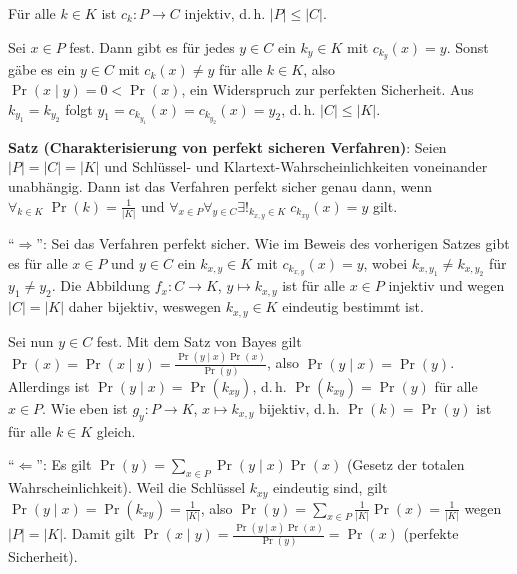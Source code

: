 \begin{Beweis}
    Für alle $k \in K$ ist $c_k\colon P \rightarrow C$ injektiv, d.\,h. $|P| \le |C|$.

    Sei $x \in P$ fest.
    Dann gibt es für jedes $y \in C$ ein $k_y \in K$ mit $c_{k_y}(x) = y$.
    Sonst gäbe es ein $y \in C$ mit $c_k(x) \not= y$ für alle $k \in K$,
    also $\Pr(x \;|\; y) = 0 < \Pr(x)$, ein Widerspruch zur perfekten Sicherheit.
    Aus $k_{y_1} = k_{y_2}$ folgt $y_1 = c_{k_{y_1}}(x) = c_{k_{y_2}}(x) = y_2$,
    d.\,h. $|C| \le |K|$.
\end{Beweis}

\linie

\textbf{Satz (Charakterisierung von perfekt sicheren Verfahren)}:
Seien  $|P| = |C| = |K|$ und Schlüssel- und Klartext-Wahrscheinlichkeiten voneinander unabhängig.
Dann ist das Verfahren perfekt sicher genau dann, wenn
$\forall_{k \in K}\; \Pr(k) = \frac{1}{|K|}$ und
$\forall_{x \in P} \forall_{y \in C} \exists!_{k_{x,y} \in K}\; c_{k_{xy}}(x) = y$ gilt.

\begin{Beweis}
    "`$\Rightarrow$"':
    Sei das Verfahren perfekt sicher.
    Wie im Beweis des vorherigen Satzes gibt es für alle $x \in P$ und $y \in C$ ein
    $k_{x,y} \in K$ mit $c_{k_{x,y}}(x) = y$,
    wobei $k_{x,y_1} \not= k_{x,y_2}$ für $y_1 \not= y_2$.
    Die Abbildung $f_x\colon C \rightarrow K$, $y \mapsto k_{x,y}$ ist für alle $x \in P$
    injektiv und wegen $|C| = |K|$ daher bijektiv, weswegen $k_{x,y} \in K$ eindeutig bestimmt ist.

    Sei nun $y \in C$ fest.
    Mit dem Satz von Bayes gilt $\Pr(x) = \Pr(x \;|\; y) = \frac{\Pr(y \;|\; x) \Pr(x)}{\Pr(y)}$,
    also $\Pr(y \;|\; x) = \Pr(y)$.
    Allerdings ist $\Pr(y \;|\; x) = \Pr(k_{xy})$, d.\,h.
    $\Pr(k_{xy}) = \Pr(y)$ für alle $x \in P$.
    Wie eben ist $g_y\colon P \rightarrow K$, $x \mapsto k_{x,y}$ bijektiv, d.\,h.
    $\Pr(k) = \Pr(y)$ ist für alle $k \in K$ gleich.

    "`$\Leftarrow$"':
    Es gilt $\Pr(y) = \sum_{x \in P} \Pr(y \;|\; x) \Pr(x)$
    (Gesetz der totalen Wahrscheinlichkeit).
    Weil die Schlüssel $k_{xy}$ eindeutig sind, gilt
    $\Pr(y \;|\; x) = \Pr(k_{xy}) = \frac{1}{|K|}$, also
    $\Pr(y) = \sum_{x \in P} \frac{1}{|K|} \Pr(x) = \frac{1}{|K|}$ wegen $|P| = |K|$.
    Damit gilt $\Pr(x \;|\; y) = \frac{\Pr(y \;|\; x) \Pr(x)}{\Pr(y)} = \Pr(x)$
    (perfekte Sicherheit).
\end{Beweis}

\pagebreak

